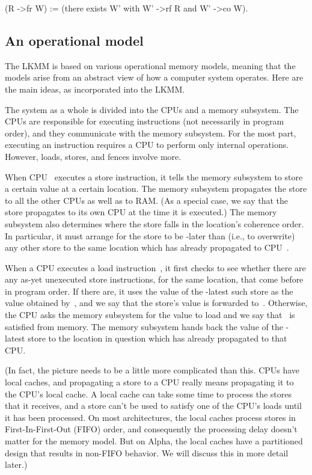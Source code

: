 \begin{VerbatimU}
	(R ->fr W) := (there exists W' with W' ->rf R and W' ->co W).
\end{VerbatimU}


\subsection{An operational model}
\label{sec:docs:explanation:An operational model}

The LKMM is based on various operational memory models, meaning that
the models arise from an abstract view of how a computer system
operates.
Here are the main ideas, as incorporated into the LKMM\@.

The system as a whole is divided into the CPUs and a memory subsystem.
The CPUs are responsible for executing instructions (not necessarily
in program order), and they communicate with the memory subsystem.
For the most part, executing an instruction requires a CPU to perform
only internal operations.
However, loads, stores, and fences involve more.

When CPU~ executes a store instruction, it tells the memory subsystem
to store a certain value at a certain location.
The memory subsystem propagates the store to all the other CPUs as well
as to RAM\@.
(As a special case, we say that the store propagates to its own CPU at the
time it is executed.)
The memory subsystem also determines where the store falls in the
location's coherence order.
In particular, it must arrange for the store to be -later than
(i.e., to overwrite) any other store to the same location which has
already propagated to CPU~.

When a CPU executes a load instruction~, it first checks to see
whether there are any as-yet unexecuted store instructions,
for the same location, that come before~ in program order.
If there are, it uses the value of the -latest such store as
the value obtained by~, and we say that the store's value is
forwarded to~.
Otherwise, the CPU asks the memory subsystem for the value to load
and we say that~ is satisfied from memory.
The memory subsystem hands back the value of the -latest store
to the location in question which has already propagated to that CPU\@.

(In fact, the picture needs to be a little more complicated than this.
CPUs have local caches, and propagating a store to a CPU really means
propagating it to the CPU's local cache.
A local cache can take some time to process the stores that it
receives, and a store can't be used to satisfy one of the CPU's loads
until it has been processed.
On most architectures, the local caches process stores in
First-In-First-Out (FIFO) order, and consequently the processing delay
doesn't matter for the memory model.
But on Alpha, the local caches have a partitioned design that results
in non-FIFO behavior.  We will discuss this in more detail later.)

